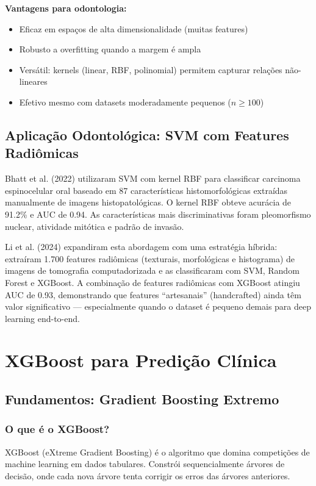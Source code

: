 \textbf{Vantagens para odontologia:}
\begin{itemize}
    \item Eficaz em espaços de alta dimensionalidade (muitas features)
    \item Robusto a overfitting quando a margem é ampla
    \item Versátil: kernels (linear, RBF, polinomial) permitem capturar relações não-lineares
    \item Efetivo mesmo com datasets moderadamente pequenos ($n \geq 100$)
\end{itemize}

\subsection{Aplicação Odontológica: SVM com Features Radiômicas}

Bhatt et al. (2022) \cite{ODT-024} utilizaram SVM com kernel RBF para classificar carcinoma espinocelular oral baseado em 87 características histomorfológicas extraídas manualmente de imagens histopatológicas. O kernel RBF obteve acurácia de 91.2\% e AUC de 0.94. As características mais discriminativas foram pleomorfismo nuclear, atividade mitótica e padrão de invasão.

Li et al. (2024) \cite{ODT-028} expandiram esta abordagem com uma estratégia híbrida: extraíram 1.700 features radiômicas (texturais, morfológicas e histograma) de imagens de tomografia computadorizada e as classificaram com SVM, Random Forest e XGBoost. A combinação de features radiômicas com XGBoost atingiu AUC de 0.93, demonstrando que features ``artesanais'' (handcrafted) ainda têm valor significativo — especialmente quando o dataset é pequeno demais para deep learning end-to-end.

\section{XGBoost para Predição Clínica}

\subsection{Fundamentos: Gradient Boosting Extremo}

\subsubsection{O que é o XGBoost?}

XGBoost (eXtreme Gradient Boosting)  é o algoritmo que domina competições de machine learning em dados tabulares. Constrói sequencialmente árvores de decisão, onde cada nova árvore tenta corrigir os erros das árvores anteriores.

